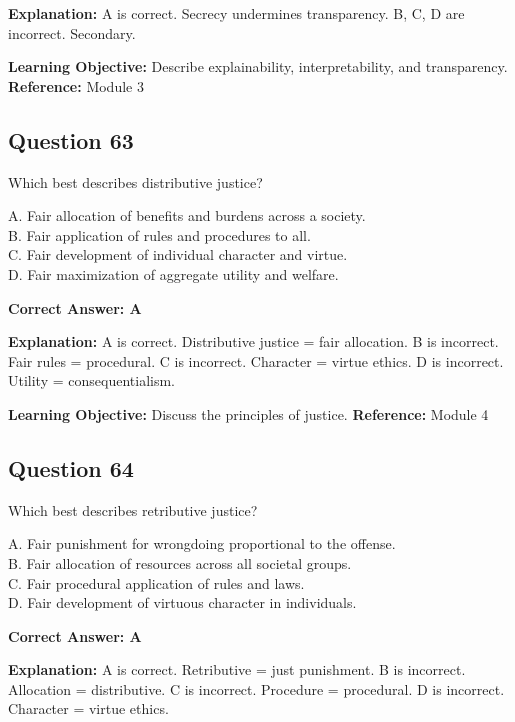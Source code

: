 \documentclass[11pt]{article}
\begin{document}
	\textbf{Explanation:}
	A is correct. Secrecy undermines transparency.
	B, C, D are incorrect. Secondary.
	
	\textbf{Learning Objective:} Describe explainability, interpretability,
	and transparency.
	\textbf{Reference:} Module 3
	
	\subsection*{Question 63}
	Which best describes distributive justice?
	
	A. Fair allocation of benefits and burdens across a society.\\
	B. Fair application of rules and procedures to all.\\
	C. Fair development of individual character and virtue.\\
	D. Fair maximization of aggregate utility and welfare.
	
	\vspace{0.4em}
	\textbf{Correct Answer: A}
	
	\textbf{Explanation:}
	A is correct. Distributive justice = fair allocation.
	B is incorrect. Fair rules = procedural.
	C is incorrect. Character = virtue ethics.
	D is incorrect. Utility = consequentialism.
	
	\textbf{Learning Objective:} Discuss the principles of justice.
	\textbf{Reference:} Module 4
	
	\subsection*{Question 64}
	Which best describes retributive justice?
	
	A. Fair punishment for wrongdoing proportional to the offense.\\
	B. Fair allocation of resources across all societal groups.\\
	C. Fair procedural application of rules and laws.\\
	D. Fair development of virtuous character in individuals.
	
	\vspace{0.4em}
	\textbf{Correct Answer: A}
	
	\textbf{Explanation:}
	A is correct. Retributive = just punishment.
	B is incorrect. Allocation = distributive.
	C is incorrect. Procedure = procedural.
	D is incorrect. Character = virtue ethics.
	
\end{document}
